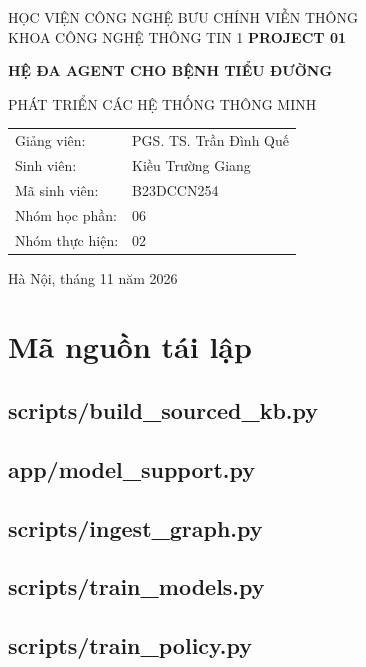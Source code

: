 \documentclass[12pt,a4paper,oneside]{report}
\begin{document}
\begin{titlepage}\centering
{\large HỌC VIỆN CÔNG NGHỆ BƯU CHÍNH VIỄN THÔNG\\KHOA CÔNG NGHỆ THÔNG TIN 1}\vfill
{\LARGE\bfseries PROJECT 01}\par\vspace{1cm}
{\Large\bfseries HỆ ĐA AGENT CHO BỆNH TIỂU ĐƯỜNG}\par\vspace{1cm}
{\large PHÁT TRIỂN CÁC HỆ THỐNG THÔNG MINH}\vfill
\begin{tabular}{ll}Giảng viên:&PGS. TS. Trần Đình Quế\\Sinh viên:&Kiều Trường Giang\\Mã sinh viên:&B23DCCN254\\Nhóm học phần:&06\\Nhóm thực hiện:&02\end{tabular}\vfill
Hà Nội, tháng 11 năm 2026\end{titlepage}\tableofcontents\clearpage\listoffigures\clearpage\listoftables\clearpage{}
\setcounter{secnumdepth}{2}\appendix\chapter{Mã nguồn tái lập}
\section{scripts/build\_sourced\_kb.py}
\section{app/model\_support.py}
\section{scripts/ingest\_graph.py}
\section{scripts/train\_models.py}
\section{scripts/train\_policy.py}
\end{document}
